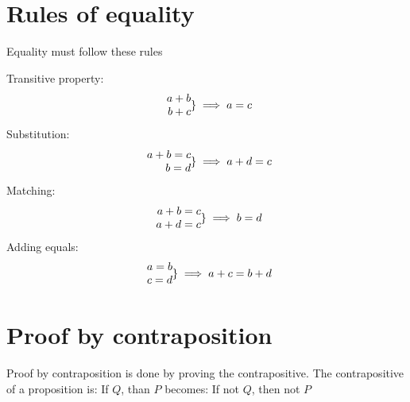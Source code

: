 \documentclass{book}
\begin{document}
\section{Rules of equality}
Equality must follow these rules
\begin{center}
	Transitive property:
	\[
		\begin{array}{r@{}l}
			a + b \\
			b + c
		\end{array}
		\rbrace \implies a = c
	\]
	Substitution:
	\[
		\begin{array}{r@{}l}
			a + b = c \\
			b = d
		\end{array}
		\rbrace \implies a + d = c
	\]
	Matching:
	\[
		\begin{array}{r@{}l}
			a + b  = c \\
			a + d = c
		\end{array}
		\rbrace \implies b = d
	\]
	Adding equals:
	\[
		\begin{array}{r@{}l}
			a = b \\
			c=d
		\end{array}
		\rbrace \implies a + c = b + d
	\]
\end{center}

\section{Proof by contraposition}
Proof by contraposition is done by proving the contrapositive.  The contrapositive of a proposition is:
If $Q$, than $P$ becomes: If not $Q$, then not $P$
\end{document}
